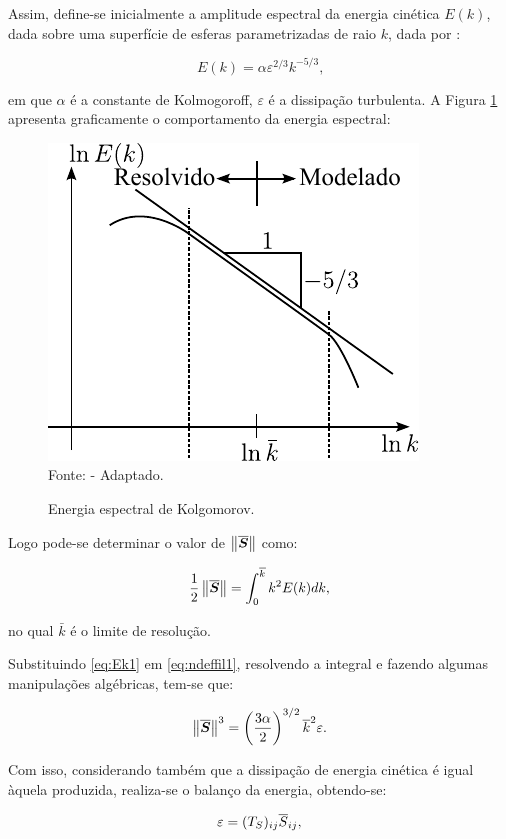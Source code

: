 Assim, define-se inicialmente a amplitude espectral da energia cinética $E(k)$, dada sobre uma superfície de esferas parametrizadas de raio $k$, dada por \cite{hughes2000large}:

\begin{equation}
    E(k)=\alpha\varepsilon^{2/3}k^{-5/3}\text{,}\label{eq:Ek1}
\end{equation}

\noindent em que $\alpha$ é a constante de Kolmogoroff, $\varepsilon$ é a dissipação turbulenta. A Figura \ref{fig:EnergiaEspectral} apresenta graficamente o comportamento da energia espectral:

\begin{figure}[h]
    \centering
    \caption{Energia espectral de Kolgomorov.}
    \includegraphics[width=0.4\linewidth]{Figuras/EnergiaEspectral.pdf}
    \\Fonte: \cite{hughes2000large} - Adaptado.
    \label{fig:EnergiaEspectral}
\end{figure}

Logo pode-se determinar o valor de $\left\lVert{\overline{\boldsymbol{S}}}\right\lVert$ como:

\begin{equation}
    \frac{1}{2}\left\lVert{\overline{\boldsymbol{S}}}\right\lVert=\int_0^{\overline{k}}{k^2E(k)dk}\text{,}\label{eq:ndeffil1}
\end{equation}

\noindent no qual $\bar{k}$ é o limite de resolução.

Substituindo \ref{eq:Ek1} em \ref{eq:ndeffil1}, resolvendo a integral e fazendo algumas manipulações algébricas, tem-se que:

\begin{equation}
    \left\lVert{\overline{\boldsymbol{S}}}\right\lVert^3=\left({\frac{3\alpha}{2}}\right)^{3/2}\overline{k}^2\varepsilon\text{.}
\end{equation}

Com isso, considerando também que a dissipação de energia cinética é igual àquela produzida, realiza-se o balanço da energia, obtendo-se:

\begin{equation}
    \varepsilon=({T}_S)_{ij}\overline{S}_{ij}\text{,}
\end{equation}

